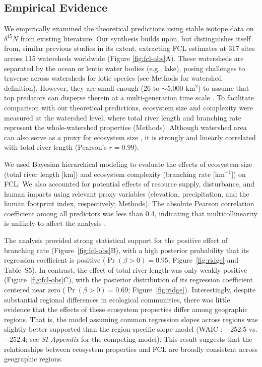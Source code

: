 \documentclass[11pt, class=article, crop=false]{standalone}
\theoremstyle{definition}
\begin{document}
\subsection{Empirical Evidence}

We empirically examined the theoretical predictions using stable isotope data on $\delta^{15}N$ from existing literature.
Our synthesis builds upon, but distinguishes itself from, similar previous studies in its extent, extracting FCL estimates at 317 sites across 115 watersheds worldwide (Figure \ref{fig:fcl-obs}A).
These watersheds are separated by the ocean or lentic water bodies (e.g., lake), posing challenges to traverse across watersheds for lotic species (see Methods for watershed definition).
However, they are small enough (26 to $\sim$5,000 km$^2$) to assume that top predators can disperse therein at a multi-generation time scale \citep{comte_fish_2018}.
To facilitate comparison with our theoretical predictions, ecosystem size and complexity were measured at the watershed level, where total river length and branching rate represent the whole-watershed properties (Methods).
Although watershed area can also serve as a proxy for ecosystem size \citep[e.g.,][]{sabo_role_2010}, it is strongly and linearly correlated with total river length (Pearson's $r = 0.99$). 

We used Bayesian hierarchical modeling to evaluate the effects of ecosystem size (total river length [km]) and ecosystem complexity (branching rate [km$^{-1}$]) on FCL.
We also accounted for potential effects of resource supply, disturbance, and human impacts using relevant proxy variables (elevation, precipitation, and the human footprint index, respectively; Methods). 
The absolute Pearson correlation coefficient among all predictors was less than 0.4, indicating that multicollinearity is unlikely to affect the analysis \citep{dormann_collinearity_2013}.

The analysis provided strong statistical support for the positive effect of branching rate (Figure~\ref{fig:fcl-obs}B), with a high posterior probability that its regression coefficient is positive ($\Pr(\beta > 0) = 0.95$; Figure~\ref{fig:ridge} and Table~S5). 
In contrast, the effect of total river length was only weakly positive (Figure~\ref{fig:fcl-obs}C), with the posterior distribution of its regression coefficient centered near zero ($\Pr(\beta > 0) = 0.69$; Figure~\ref{fig:ridge}).
Interestingly, despite substantial regional differences in ecological communities, there was little evidence that the effects of these ecosystem properties differ among geographic regions. 
That is, the model assuming common regression slopes across regions was slightly better supported than the region-specific slope model (WAIC \citep{watanabe_asymptotic_2010}: $-252.5$ vs. $-252.4$; see \textit{SI Appendix} for the competing model). 
This result suggests that the relationships between ecosystem properties and FCL are broadly consistent across geographic regions.
\end{document}
